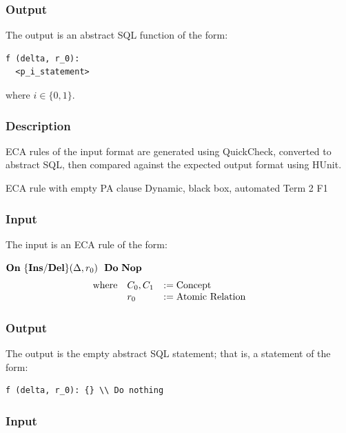 \documentclass[12pt]{report}
\begin{document}
\vspace{-12pt}\subsubsection*{Output}

The output is an abstract SQL function of the form:
\begin{verbatim}
f (delta, r_0):
  <p_i_statement>
\end{verbatim}
where $i \in \{ 0, 1 \}$. 

\vspace{-12pt}\subsubsection*{Description}

ECA rules of the input format are generated using QuickCheck, converted to
  abstract SQL, then compared against the expected output format using HUnit.

{ECA rule with empty PA clause} 
{Dynamic, black box, automated}  
{Term 2}
{F1}
\vspace{-12pt}\subsubsection*{Input}
The input is an ECA rule of the form:

$\mathbf{On~} \mathbf{\{Ins/Del\}}(\Delta,r_0) \,\,\,\,\mathbf{Do~} \mathbf{Nop~} $
\vspace{-10pt}\[\hspace{-20pt}\begin{array}{lll}
\text{where} & C_0, C_1 & := \text{Concept} \\ 
             & r_0      & := \text{Atomic Relation} \\ 
\end{array}\]

\vspace{-12pt}\subsubsection*{Output}

The output is the empty abstract SQL statement; that is, a statement of the form:
\begin{verbatim}
f (delta, r_0): {} \\ Do nothing
\end{verbatim}

\vspace{-12pt}\subsubsection*{Input}
\end{document}
